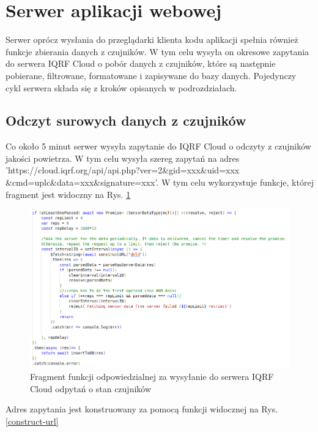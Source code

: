 \section{Serwer aplikacji webowej}

Serwer oprócz wysłania do przeglądarki klienta kodu aplikacji spełnia również funkcje zbierania danych z czujników. W tym celu wysyła on okresowe zapytania
do serwera IQRF Cloud o pobór danych z czujników, które są następnie pobierane, filtrowane, formatowane i zapisywane do bazy danych. Pojedynczy cykl serwera składa
się z kroków opisanych w podrozdziałach.

\subsection{Odczyt surowych danych z czujników}
Co około 5 minut serwer wysyła zapytanie do IQRF Cloud o odczyty z czujników jakości powietrza. W tym celu wysyła szereg zapytań na adres \\
'https://cloud.iqrf.org/api/api.php?ver=2\&gid=xxx\&uid=xxx\\\&cmd=uplc\&data=xxx\&signature=xxx'.
W tym celu wykorzystuje funkcje, której fragment jest widoczny na Rys. \ref{iqrf-query1}

\begin{figure}[H]
    \includegraphics[width=\textwidth]{zdj/app/poll-fragment.png}
    \caption{Fragment funkcji odpowiedzialnej za wysyłanie do serwera IQRF Cloud odpytań o stan czujników}
    \label{iqrf-query1}
\end{figure}

Adres zapytania jest konstruowany za pomocą funkcji widocznej na Rys. \ref{construct-url}

